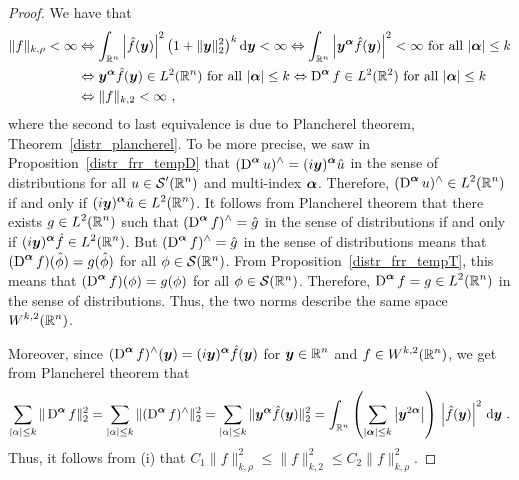 \begin{proof}
  We have that
\begin{align*}
\|f\|_{k,\rho} < \infty
&\Leftrightarrow \int_{\mathbb{R}^n} \left| \hat{f}({\bm{y}})\right|^2
\big( 1 + \|{\bm{y}}\|_2^2\big)^k \,\mathrm{d}{{\bm{y}}} < \infty
\Leftrightarrow \int_{\mathbb{R}^n} \left| {\bm{y}}^{{\bm{\alpha}}}
\hat{f}({\bm{y}}) \right|^2 < \infty \ \text{for all} \ |{\bm{\alpha}}| \leq k \\
&\Leftrightarrow {\bm{y}}^{{\bm{\alpha}}} \hat{f}({\bm{y}}) \in L^2(\mathbb{R}^n)
 \ \text{for all} \ |{\bm{\alpha}}| \leq k  
\Leftrightarrow \operatorname{D}^{{\bm{\alpha}}} f \in L^2(\mathbb{R}^2) 
  \ \text{for all} \ |{\bm{\alpha}}| \leq k \\
&\Leftrightarrow \|f\|_{k,2} < \infty \ ,
\end{align*}
where the second to last equivalence is due to 
Plancherel theorem, Theorem~\ref{distr_plancherel}.  To be
more precise, we saw in Proposition~\ref{distr_frr_tempD} that 
$\displaystyle (\operatorname{D}^{{\bm{\alpha}}} u)^\wedge
= (i {\bm{y}})^{{\bm{\alpha}}} \hat{u}$ in the
sense of distributions for all $\displaystyle u \in \mathcal{S}'(\mathbb{R}^n)$ and
multi-index ${\bm{\alpha}}$.
Therefore, $\displaystyle (\operatorname{D}^{{\bm{\alpha}}} u)^\wedge \in L^2(\mathbb{R}^n)$
if and only if
$\displaystyle (i {\bm{y}})^{{\bm{\alpha}}} \hat{u} \in L^2(\mathbb{R}^n)$.  It follows
from Plancherel theorem that there exists $\displaystyle g \in L^2(\mathbb{R}^n)$
such that $\displaystyle (\operatorname{D}^{{\bm{\alpha}}} f)^\wedge = \hat{g}$ in
the sense of distributions if and only if
$\displaystyle (i {\bm{y}})^{{\bm{\alpha}}} \hat{f} \in L^2(\mathbb{R}^n)$.
But $\displaystyle (\operatorname{D}^{{\bm{\alpha}}} f)^\wedge = \hat{g}$ in the sense of
distributions means that
$\displaystyle (\operatorname{D}^{{\bm{\alpha}}} f)(\hat{\phi}) = g(\hat{\phi})$
for all $\phi \in \mathcal{S}(\mathbb{R}^n)$.  From
Proposition~\ref{distr_frr_tempT}, this means that
$\displaystyle (\operatorname{D}^{{\bm{\alpha}}} f)(\phi) = g(\phi)$
for all $\phi \in \mathcal{S}(\mathbb{R}^n)$.  Therefore,
$\displaystyle \operatorname{D}^{{\bm{\alpha}}} f = g \in L^2(\mathbb{R}^n)$ in the sense of
distributions.
Thus, the two norms describe the same space $\displaystyle W^{k,2}(\mathbb{R}^n)$.

Moreover, since
$\displaystyle (\operatorname{D}^{{\bm{\alpha}}} f)^\wedge({\bm{y}})
=(i{\bm{y}})^{{\bm{\alpha}}} \hat{f}({\bm{y}})$
for $\displaystyle {\bm{y}}\in \mathbb{R}^n$ and
$\displaystyle f \in W^{k,2}(\mathbb{R}^n)$, we get from Plancherel theorem that
\[
\sum_{|\alpha|\leq k} \| \operatorname{D}^{{\bm{\alpha}}} f \|_2^2 =
\sum_{|\alpha|\leq k} \| (\operatorname{D}^{{\bm{\alpha}}} f)^\wedge \|_2^2 =
\sum_{|\alpha|\leq k} \| {\bm{y}}^{{\bm{\alpha}}} \hat{f}({\bm{y}}) \|_2^2 =
\int_{\mathbb{R}^n} \left( \sum_{|{\bm{\alpha}}|\leq k}
\left|{\bm{y}}^{2{{\bm{\alpha}}}}\right| \right)
\, \left| \hat{f}({\bm{y}}) \right|^2 \,\mathrm{d}{{\bm{y}}} \ .
\]
Thus, it follows from (i) that $\displaystyle C_1 \|f\|_{k,\rho}^2
\leq \|f\|_{k,2}^2 \leq C_2 \|f\|_{k,\rho}^2$.
\end{proof}


